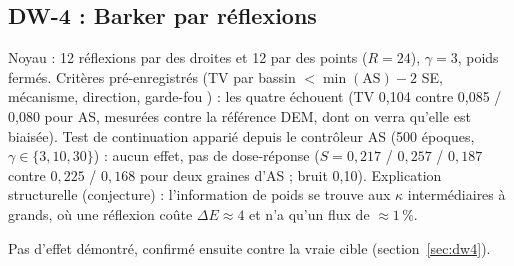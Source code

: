 \subsection{DW-4 : Barker par réflexions}
Noyau : 12 réflexions par des droites et 12 par des points ($R=24$), $\gamma=3$, poids fermés. Critères pré-enregistrés (TV par bassin $<\min(\text{AS})-2$ SE, mécanisme, direction, garde-fou ) : les quatre échouent (TV 0,104 contre 0,085 / 0,080 pour AS, mesurées contre la référence DEM, dont on verra qu'elle est biaisée). Test de continuation apparié depuis le contrôleur AS (500 époques, $\gamma\in\{3,10,30\}$) : aucun effet, pas de dose-réponse ($S=0{,}217$ / $0{,}257$ / $0{,}187$ contre $0{,}225$ / $0{,}168$ pour deux graines d'AS ; bruit 0,10). Explication structurelle (conjecture) : l'information de poids se trouve aux $\kappa$ intermédiaires à grands, où une réflexion coûte $\Delta E\approx4$ et n'a qu'un flux de $\approx1\,\%$.
\begin{verdict}Pas d'effet démontré, confirmé ensuite contre la vraie cible (section~\ref{sec:dw4}).\end{verdict}
